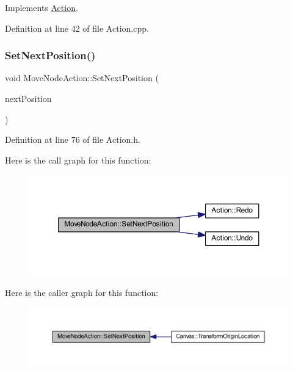 Implements \hyperlink{class_action_a69864cea344385ee84a5120eaab5d82a}{Action}.



Definition at line 42 of file Action.\+cpp.

\mbox{\label{class_move_node_action_a84fd47d3f670edfc79c089d5efb6daca}} 
\subsubsection{\texorpdfstring{Set\+Next\+Position()}{SetNextPosition()}}
{\footnotesize\ttfamily void Move\+Node\+Action\+::\+Set\+Next\+Position (\begin{DoxyParamCaption}\item[{const wx\+Point2\+D\+Double \&}]{next\+Position }\end{DoxyParamCaption})\hspace{0.3cm}{\ttfamily [inline]}}



Definition at line 76 of file Action.\+h.

Here is the call graph for this function\+:
\nopagebreak
\begin{figure}[H]
\begin{center}
\leavevmode
\includegraphics[width=350pt]{class_move_node_action_a84fd47d3f670edfc79c089d5efb6daca_cgraph}
\end{center}
\end{figure}
Here is the caller graph for this function\+:
\nopagebreak
\begin{figure}[H]
\begin{center}
\leavevmode
\includegraphics[width=350pt]{class_move_node_action_a84fd47d3f670edfc79c089d5efb6daca_icgraph}
\end{center}
\end{figure}
\mbox{\label{class_move_node_action_a70dcb3f48867ce7b5d57c9d15794984a}} 
